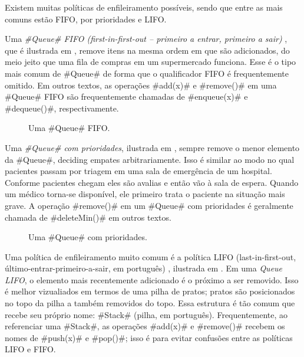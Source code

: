Existem muitas políticas de enfileiramento possíveis, sendo que entre as mais comuns estão FIFO, por prioridades e LIFO.

Uma \emph{#Queue# FIFO (first-in-first-out -- primeiro a entrar, primeiro a sair) },
%
%
que é ilustrada em 
, remove itens na mesma ordem em que são adicionados, do meio jeito que uma fila de compras em um supermercado funciona.
Esse é o tipo mais comum de #Queue# de forma que o qualificador FIFO é frequentemente omitido.
Em outros textos, as operações #add(x)# e #remove()# em uma #Queue# FIFO são frequentemente chamadas de  #enqueue(x)# e #dequeue()#, respectivamente.

\begin{figure}
  \caption[Uma queue (fila) FIFO]{Uma #Queue# FIFO.}
\end{figure}

Uma \emph{#Queue# com prioridades},
%
%
%
%
ilustrada em , sempre 
remove o menor elemento da #Queue#, deciding empates arbitrariamente.
Isso é similar ao modo no qual pacientes passam por triagem em uma sala de emergência de um hospital. Conforme pacientes chegam eles são avalias e então
vão à sala de espera. Quando um médico torna-se disponível, ele primeiro trata o paciente na situação mais grave. A operação #remove()# em um #Queue# com prioridades é geralmente chamada de #deleteMin()# em outros textos.

\begin{figure}
  \caption[Uma fila com prioridades (no inglês, priority queue)]{Uma #Queue# com prioridades.}
\end{figure}


Uma política de enfileiramento muito comum é a política LIFO (last-in-first-out, último-entrar-primeiro-a-sair, em português)
%
%
%
%
%
%
, ilustrada em . Em uma \emph{Queue LIFO},
o elemento mais recentemente adicionado é o próximo a ser removido. 
Isso é melhor vizualiados em termos de uma pilha de pratos; pratos são 
posicionados no topo da pilha a também removidos do topo. Essa estrutura
é tão comum que recebe seu próprio nome: #Stack# (pilha, em português). Frequentemente, ao referenciar uma #Stack#, as operações #add(x)# e #remove()# 
recebem os nomes de #push(x)# e #pop()#; isso é para evitar confusões entre as políticas LIFO e FIFO.

